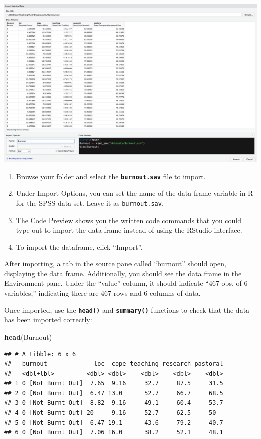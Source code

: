 \documentclass[
]{book}
\newenvironment{Shaded}{\begin{snugshade}}{\end{snugshade}}
\newcommand{\FunctionTok}[1]{\textcolor[rgb]{0.13,0.29,0.53}{\textbf{#1}}}
\newcommand{\NormalTok}[1]{#1}
\begin{document}
\includegraphics{img/04-import-sav.png}

\begin{enumerate}
\def\labelenumi{\arabic{enumi}.}
\setcounter{enumi}{5}
\item
  Browse your folder and select the \textbf{\texttt{burnout.sav}} file to import.
\item
  Under Import Options, you can set the name of the data frame variable in R for the SPSS data set. Leave it as \texttt{burnout.sav}.
\item
  The Code Preview shows you the written code commands that you could type out to import the data frame instead of using the RStudio interface.
\item
  To import the dataframe, click ``Import''.
\end{enumerate}

After importing, a tab in the source pane called ``burnout'' should open, displaying the data frame. Additionally, you should see the data frame in the Environment pane. Under the ``value'' column, it should indicate ``467 obs. of 6 variables,'' indicating there are 467 rows and 6 columns of data.

Once imported, use the \textbf{\texttt{head()}} and \textbf{\texttt{summary()}} functions to check that the data has been imported correctly:

\begin{Shaded}
\begin{Highlighting}[]
\FunctionTok{head}\NormalTok{(Burnout)}
\end{Highlighting}
\end{Shaded}

\begin{verbatim}
## # A tibble: 6 x 6
##   burnout             loc  cope teaching research pastoral
##   <dbl+lbl>         <dbl> <dbl>    <dbl>    <dbl>    <dbl>
## 1 0 [Not Burnt Out]  7.65  9.16     32.7     87.5     31.5
## 2 0 [Not Burnt Out]  6.47 13.0      52.7     66.7     68.5
## 3 0 [Not Burnt Out]  8.82  9.16     49.1     60.4     53.7
## 4 0 [Not Burnt Out] 20     9.16     52.7     62.5     50  
## 5 0 [Not Burnt Out]  6.47 19.1      43.6     79.2     40.7
## 6 0 [Not Burnt Out]  7.06 16.0      38.2     52.1     48.1
\end{verbatim}
\end{document}
